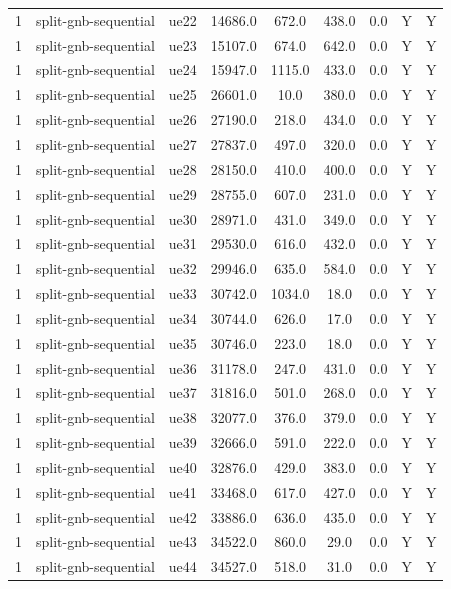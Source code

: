 \begin{table}[ht]
\begin{tabular}{|c|c|c|c|c|c|c|c|c|}
1 & split-gnb-sequential & ue22 & 14686.0 & 672.0 & 438.0 & 0.0 & Y & Y \\
1 & split-gnb-sequential & ue23 & 15107.0 & 674.0 & 642.0 & 0.0 & Y & Y \\
1 & split-gnb-sequential & ue24 & 15947.0 & 1115.0 & 433.0 & 0.0 & Y & Y \\
1 & split-gnb-sequential & ue25 & 26601.0 & 10.0 & 380.0 & 0.0 & Y & Y \\
1 & split-gnb-sequential & ue26 & 27190.0 & 218.0 & 434.0 & 0.0 & Y & Y \\
1 & split-gnb-sequential & ue27 & 27837.0 & 497.0 & 320.0 & 0.0 & Y & Y \\
1 & split-gnb-sequential & ue28 & 28150.0 & 410.0 & 400.0 & 0.0 & Y & Y \\
1 & split-gnb-sequential & ue29 & 28755.0 & 607.0 & 231.0 & 0.0 & Y & Y \\
1 & split-gnb-sequential & ue30 & 28971.0 & 431.0 & 349.0 & 0.0 & Y & Y \\
1 & split-gnb-sequential & ue31 & 29530.0 & 616.0 & 432.0 & 0.0 & Y & Y \\
1 & split-gnb-sequential & ue32 & 29946.0 & 635.0 & 584.0 & 0.0 & Y & Y \\
1 & split-gnb-sequential & ue33 & 30742.0 & 1034.0 & 18.0 & 0.0 & Y & Y \\
1 & split-gnb-sequential & ue34 & 30744.0 & 626.0 & 17.0 & 0.0 & Y & Y \\
1 & split-gnb-sequential & ue35 & 30746.0 & 223.0 & 18.0 & 0.0 & Y & Y \\
1 & split-gnb-sequential & ue36 & 31178.0 & 247.0 & 431.0 & 0.0 & Y & Y \\
1 & split-gnb-sequential & ue37 & 31816.0 & 501.0 & 268.0 & 0.0 & Y & Y \\
1 & split-gnb-sequential & ue38 & 32077.0 & 376.0 & 379.0 & 0.0 & Y & Y \\
1 & split-gnb-sequential & ue39 & 32666.0 & 591.0 & 222.0 & 0.0 & Y & Y \\
1 & split-gnb-sequential & ue40 & 32876.0 & 429.0 & 383.0 & 0.0 & Y & Y \\
1 & split-gnb-sequential & ue41 & 33468.0 & 617.0 & 427.0 & 0.0 & Y & Y \\
1 & split-gnb-sequential & ue42 & 33886.0 & 636.0 & 435.0 & 0.0 & Y & Y \\
1 & split-gnb-sequential & ue43 & 34522.0 & 860.0 & 29.0 & 0.0 & Y & Y \\
1 & split-gnb-sequential & ue44 & 34527.0 & 518.0 & 31.0 & 0.0 & Y & Y \\

\end{tabular}
\end{table}
